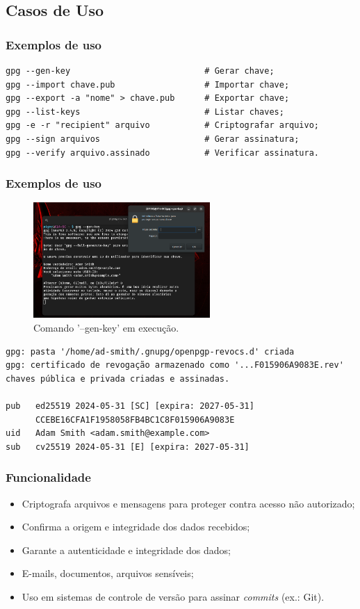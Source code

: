 \documentclass[aspectratio=169]{beamer}
\begin{document}
\subsection{Casos de Uso}
\begin{frame}[fragile]
	\frametitle{Exemplos de uso}
	\begin{lstlisting}[caption=Parâmetros úteis]
gpg --gen-key                           # Gerar chave;
gpg --import chave.pub                  # Importar chave;
gpg --export -a "nome" > chave.pub      # Exportar chave;
gpg --list-keys                         # Listar chaves;
gpg -e -r "recipient" arquivo           # Criptografar arquivo;
gpg --sign arquivos                     # Gerar assinatura;
gpg --verify arquivo.assinado           # Verificar assinatura.
        \end{lstlisting}
\end{frame}
\begin{frame}
	\frametitle{Exemplos de uso}
	\begin{figure}[ht!]
		\centering
		\includegraphics[width=0.6\textwidth]{figuras/genkey.png}
		\caption{Comando '--gen-key' em execução.}
	\end{figure}
\end{frame}
\begin{frame}[fragile]
	\begin{lstlisting}[caption=Saída de exemplo]
gpg: pasta '/home/ad-smith/.gnupg/openpgp-revocs.d' criada
gpg: certificado de revogação armazenado como '...F015906A9083E.rev'
chaves pública e privada criadas e assinadas.

pub   ed25519 2024-05-31 [SC] [expira: 2027-05-31]
      CCEBE16CFA1F1958058FB4BC1C8F015906A9083E
uid   Adam Smith <adam.smith@example.com>
sub   cv25519 2024-05-31 [E] [expira: 2027-05-31]
\end{lstlisting}
\end{frame}
\begin{frame}
	\frametitle{Funcionalidade}
	\begin{itemize}
		\item Criptografa arquivos e mensagens para proteger contra acesso não autorizado;
		\item Confirma a origem e integridade dos dados recebidos;
		\item Garante a autenticidade e integridade dos dados;
		\item E-mails, documentos, arquivos sensíveis;
		\item Uso em sistemas de controle de versão \cite{lucas2006pgp} para assinar \textit{commits} (ex.: Git).
	\end{itemize}
\end{frame}
\end{document}
